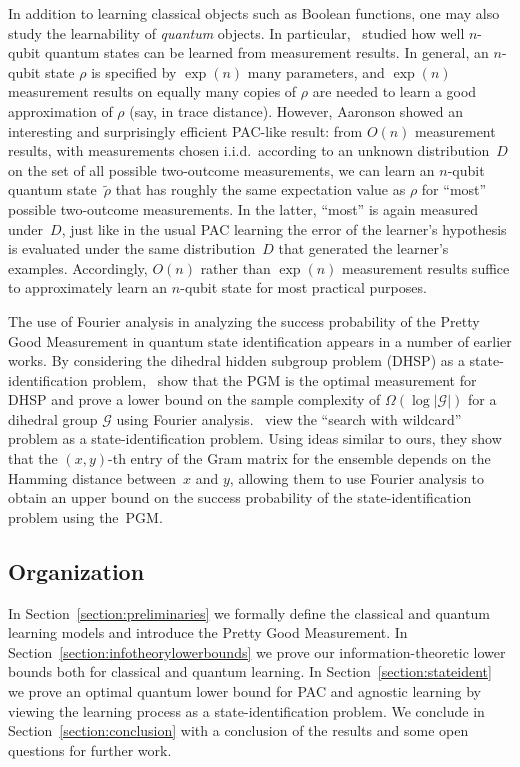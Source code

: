 \documentclass[twoside,11pt]{article}
\newcommand{\G}{\ensuremath{\mathscr{G}}}
\begin{document}
In addition to learning classical objects such as Boolean functions, one may also study the learnability of \emph{quantum} objects.  In particular,~\cite{aaronson:qlearnability} studied how well $n$-qubit quantum states can be learned from measurement results.  In general, an $n$-qubit state $\rho$ is specified by $\exp(n)$ many parameters, and $\exp(n)$ measurement results on equally many copies of $\rho$ are needed to learn a good approximation of $\rho$ (say, in trace distance).  However, Aaronson showed an interesting and surprisingly efficient PAC-like result: from $O(n)$ measurement results, with measurements chosen i.i.d.\ according to an unknown distribution~$D$ on the set of all possible two-outcome measurements, we can learn an $n$-qubit quantum state~$\widetilde{\rho}$ that has roughly the same expectation value as $\rho$ for ``most'' possible two-outcome measurements. In the latter, ``most'' is again measured under~$D$, just like in the usual PAC learning the error of the learner's hypothesis is evaluated under the same distribution~$D$ that generated the learner's examples. Accordingly, $O(n)$ rather than $\exp(n)$ measurement results suffice to approximately learn an $n$-qubit state for most practical purposes.

The use of Fourier analysis in analyzing the success probability of the Pretty Good Measurement in quantum state identification appears in a number of earlier works. By considering the dihedral hidden subgroup problem (DHSP) as a state-identification problem,~\cite{bacon:hiddensubgroup} show that the PGM is the optimal measurement for DHSP and prove a lower bound on the sample complexity of $\Omega(\log |\G|)$ for a dihedral group $\G$ using Fourier analysis.~\cite{ambainis&montanaro:wildcard&CGT} view the ``search with wildcard'' problem as a state-identification problem. Using ideas similar to ours, they show that the $(x,y)$-th entry of the Gram matrix for the ensemble depends on the Hamming distance between~$x$ and $y$, allowing them to use Fourier analysis to obtain an upper bound on the success probability of the state-identification problem using the~PGM.

\subsection{Organization}
In Section~\ref{section:preliminaries} we formally define the classical and quantum learning models and introduce the Pretty Good Measurement. In Section~\ref{section:infotheorylowerbounds} we prove our information-theoretic lower bounds both for classical and quantum learning. In Section~\ref{section:stateident} we prove an optimal quantum lower bound for PAC and agnostic learning by viewing the learning process as a state-identification problem. We conclude in Section~\ref{section:conclusion} with a conclusion of the results and some open questions for further work.
\end{document}
